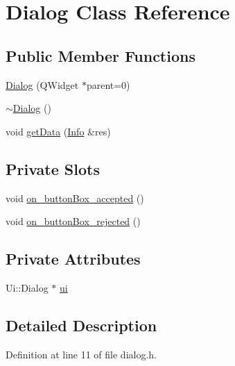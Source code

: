 \hypertarget{class_dialog}{\section{Dialog Class Reference}
\label{class_dialog}
}
\subsection*{Public Member Functions}
\begin{DoxyCompactItemize}
\item 
\hyperlink{class_dialog_acfa2063f9f962d394c6a645b6e7e08d8}{Dialog} (Q\+Widget $\ast$parent=0)
\item 
\hyperlink{class_dialog_a2a1fe6ef28513eed13bfcd3a4da83ccb}{$\sim$\+Dialog} ()
\item 
void \hyperlink{class_dialog_a069e8b0696869cdd993f1b2a87bddbc2}{get\+Data} (\hyperlink{struct_info}{Info} \&res)
\end{DoxyCompactItemize}
\subsection*{Private Slots}
\begin{DoxyCompactItemize}
\item 
void \hyperlink{class_dialog_aafe2aef7fbd4d6158b2ac7ed42cbf985}{on\+\_\+button\+Box\+\_\+accepted} ()
\item 
void \hyperlink{class_dialog_a932a060bc56692af1d024203360e839d}{on\+\_\+button\+Box\+\_\+rejected} ()
\end{DoxyCompactItemize}
\subsection*{Private Attributes}
\begin{DoxyCompactItemize}
\item 
Ui\+::\+Dialog $\ast$ \hyperlink{class_dialog_aaa4b5bfb9a0f64900d524f14bc32e6df}{ui}
\end{DoxyCompactItemize}


\subsection{Detailed Description}


Definition at line 11 of file dialog.\+h.



